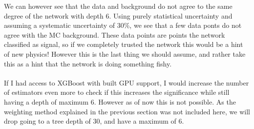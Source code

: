 \documentclass[14pt, a4paper]{book}
\begin{document}
We can however see that the data and background do not agree to the same degree of the network with depth 6. Using purely statistical uncertainty and assuming a systematic uncertainty of 30\%, we see that a few data ponts do not agree with the MC background.
These data points are points the network classified as signal, so if we completely trusted the network this would be a hint of new physics! 
However this is the last thing we should assume, and rather take this as a hint that the network is doing something fishy.\\
\\If I had access to XGBoost with built GPU support, I would increase the number of estimators even more to check if this increases the significance while still having a depth of maximum 6.
However as of now this is not possible. As the weighting method explained in the previous section was not included here, we will drop going to a tree depth of 30, and have a maximum of 6.
\end{document}
